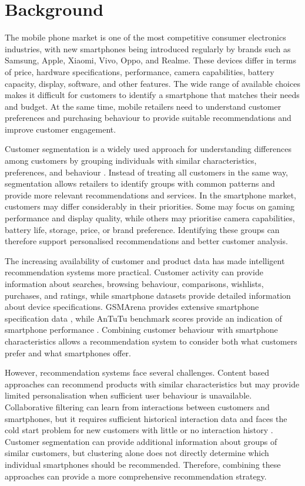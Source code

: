 \documentclass[12pt]{report}
\numberwithin{figure}{chapter}
\numberwithin{table}{chapter}
\numberwithin{equation}{chapter}
\begin{document}
\section{Background}

The mobile phone market is one of the most competitive consumer electronics industries, with new smartphones being introduced regularly by brands such as Samsung, Apple, Xiaomi, Vivo, Oppo, and Realme. These devices differ in terms of price, hardware specifications, performance, camera capabilities, battery capacity, display, software, and other features. The wide range of available choices makes it difficult for customers to identify a smartphone that matches their needs and budget. At the same time, mobile retailers need to understand customer preferences and purchasing behaviour to provide suitable recommendations and improve customer engagement.

Customer segmentation is a widely used approach for understanding differences among customers by grouping individuals with similar characteristics, preferences, and behaviour \cite{singh}. Instead of treating all customers in the same way, segmentation allows retailers to identify groups with common patterns and provide more relevant recommendations and services. In the smartphone market, customers may differ considerably in their priorities. Some may focus on gaming performance and display quality, while others may prioritise camera capabilities, battery life, storage, price, or brand preference. Identifying these groups can therefore support personalised recommendations and better customer analysis.

The increasing availability of customer and product data has made intelligent recommendation systems more practical. Customer activity can provide information about searches, browsing behaviour, comparisons, wishlists, purchases, and ratings, while smartphone datasets provide detailed information about device specifications. GSMArena provides extensive smartphone specification data \cite{gsmarena}, while AnTuTu benchmark scores provide an indication of smartphone performance \cite{antutu}. Combining customer behaviour with smartphone characteristics allows a recommendation system to consider both what customers prefer and what smartphones offer.

However, recommendation systems face several challenges. Content based approaches can recommend products with similar characteristics but may provide limited personalisation when sufficient user behaviour is unavailable. Collaborative filtering can learn from interactions between customers and smartphones, but it requires sufficient historical interaction data and faces the cold start problem for new customers with little or no interaction history \cite{pandey}. Customer segmentation can provide additional information about groups of similar customers, but clustering alone does not directly determine which individual smartphones should be recommended. Therefore, combining these approaches can provide a more comprehensive recommendation strategy.
\end{document}
